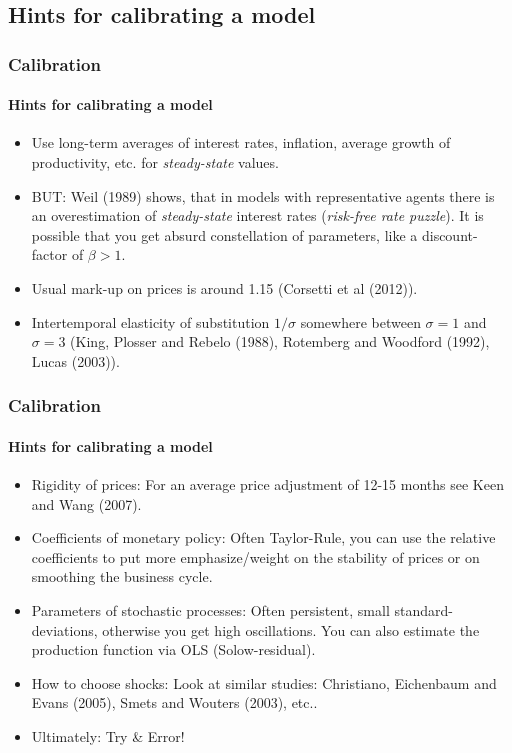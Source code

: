\documentclass[handout]{beamer}  %
\begin{document}
\subsection{Hints for calibrating a model}
\begin{frame}\frametitle{Calibration}\framesubtitle{Hints for calibrating a model}

\begin{itemize}
   \item Use long-term averages of interest rates, inflation, average
       growth of productivity, etc. for \emph{steady-state} values.
   \item BUT: Weil (1989) shows, that in models with representative
       agents there is an overestimation of \emph{steady-state} interest
       rates (\emph{risk-free rate puzzle}). It is possible that you get
       absurd constellation of parameters, like a discount-factor of
       $\beta>1$.
   \item Usual mark-up on prices is around 1.15 (Corsetti et al (2012)).
   \item Intertemporal elasticity of substitution  $1/\sigma$ somewhere
       between $\sigma=1$ and $\sigma=3$ (King, Plosser and Rebelo
       (1988), Rotemberg and Woodford (1992), Lucas (2003)).
\end{itemize}
\end{frame}

\begin{frame}\frametitle{Calibration}\framesubtitle{Hints for calibrating a model}
\begin{itemize}
   \item Rigidity of prices: For an average price adjustment of 12-15
       months see Keen and Wang (2007).
   \item Coefficients of monetary policy: Often Taylor-Rule, you can use
       the relative coefficients to put more emphasize/weight on the
       stability of prices or on smoothing the business cycle.
   \item Parameters of stochastic processes: Often persistent, small
       standard-deviations, otherwise you get high oscillations. You can
       also estimate the production function via OLS (Solow-residual).
   \item How to choose shocks: Look at similar studies: Christiano,
       Eichenbaum and Evans (2005), Smets and Wouters (2003), etc..
   \item Ultimately: Try \& Error!
\end{itemize}
\end{frame}
\end{document}

